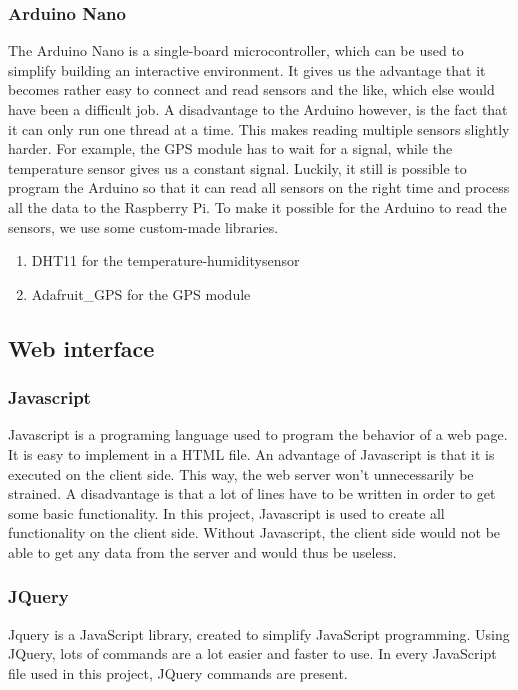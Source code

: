 \subsubsection{Arduino Nano}
The Arduino Nano is a single-board microcontroller, which can be used to simplify building an interactive environment. It gives us the advantage that it becomes rather easy to connect and read sensors and the like, which else would have been a difficult job. A disadvantage to the Arduino however, is the fact that it can only run one thread at a time. This makes reading multiple sensors slightly harder. For example, the GPS module has to wait for a signal, while the temperature sensor gives us a constant signal. Luckily, it still is possible to program the Arduino so that it can read all sensors on the right time and process all the data to the Raspberry Pi.
To make it possible for the Arduino to read the sensors, we use some custom-made libraries.
\begin{enumerate}
 \item DHT11 for the temperature-humiditysensor
 \item Adafruit\_GPS for the GPS module
\end{enumerate}

\subsection{Web interface}
\subsubsection{Javascript}
Javascript is a programing language used to program the behavior of a web page.
It is easy to implement in a HTML file. An advantage of Javascript is that it is
executed on the client side. This way, the web server won't unnecessarily be strained.
A disadvantage is that a lot of lines have to be written in order to get some basic
functionality. In this project, Javascript is used to create all functionality on the
client side. Without Javascript, the client side would not be able to get any data from
the server and would thus be useless. 

\subsubsection{JQuery}
Jquery is a JavaScript library, created to simplify JavaScript programming. Using JQuery,
lots of commands are a lot easier and faster to use. In every JavaScript file used in this
project, JQuery commands are present.

